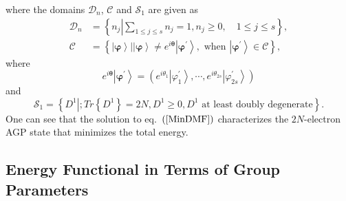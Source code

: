 \documentclass[aps,preprint]{revtex4}%
\begin{document}
where the domains $\mathcal{D}_{n}$, $\mathcal{C}$ and $\mathcal{S}_{1}$ are
given as%
\begin{align}
\mathcal{D}_{n}  &  =\left\{  n_{j}\left\vert \sum_{1\leq j\leq s}%
n_{j}=1,n_{j}\geq0,\quad1\leq j\leq s\right.  \right\}  ,\\
\mathcal{C}  &  =\left\{  \left.  \left\vert \mathbf{\varphi}\right\rangle
\right\vert \left\vert \mathbf{\varphi}\right\rangle \neq e^{i\mathbf{\theta}%
}\left\vert \mathbf{\varphi}^{\prime}\right\rangle ,\text{ when }\left\vert
\mathbf{\varphi}^{\prime}\right\rangle \in\mathcal{C}\right\}  ,
\end{align}
where
\begin{equation}
e^{i\mathbf{\theta}}\left\vert \mathbf{\varphi}^{\prime}\right\rangle =\left(
e^{i\theta_{1}}\left\vert \varphi_{1}^{\prime}\right\rangle ,\cdots
,e^{i\theta_{2s}}\left\vert \varphi_{2s}^{\prime}\right\rangle \right)
\end{equation}
and
\begin{equation}
\mathcal{S}_{1}=\left\{  \left.  D^{1}\right\vert ;Tr\left\{  D^{1}\right\}
=2N,D^{1}\geq0,D^{1}\text{ at least doubly degenerate}\right\}  .
\end{equation}
One can see that the solution to eq.\ $\left(  \ref{MinDMF}\right)  $
characterizes the $2N$-electron AGP state that minimizes the total energy.

\subsection{Energy Functional in Terms of Group Parameters\label{Group_Param}}
\end{document}
